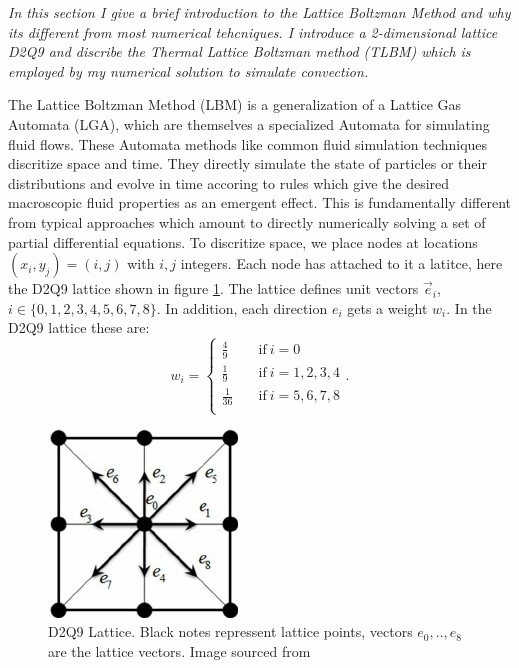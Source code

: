 \documentclass{article}
\begin{document}
{\it{In this section I give a brief introduction to the Lattice Boltzman Method and why its different from most numerical tehcniques. I introduce a 2-dimensional lattice D2Q9 and discribe the Thermal Lattice Boltzman method (TLBM) which is employed by my numerical solution to simulate convection.}}
\vspace{0.3cm}

\noindent The Lattice Boltzman Method (LBM) is a generalization of a Lattice Gas Automata (LGA), which are themselves a 
specialized Automata for simulating fluid flows. These Automata methods like common fluid simulation techniques 
discritize space and time. They directly simulate the state of particles or their distributions and evolve in time 
accoring to rules which give the desired macroscopic fluid properties as an emergent effect. This is fundamentally 
different from typical approaches which amount to directly numerically solving a set of partial differential equations.
\newline
\noindent To discritize space, we place nodes at locations $(x_i,y_j)=(i,j)$ with $i,j$ integers. Each node has attached to it a latitce, here the D2Q9 lattice shown in figure \ref{D2Q9}. The lattice defines unit vectors $\vec{e}_i$, $i \in \{ 0,1,2,3,4,5,6,7,8 \}$. In addition, each direction $e_i$ gets a weight $w_i$. In the D2Q9 lattice these are:
\begin{equation*}
w_i = \begin{cases}
          \frac{4}{9} \quad &\text{if}  \ i=0 \\
          \frac{1}{9} \quad &\text{if} \ i=1,2,3,4 \\
          \frac{1}{36} \quad &\text{if} \ i=5,6,7,8 \\
     \end{cases}.
\end{equation*}
\begin{figure}[h!]
	\centering
	\includegraphics{D2Q9Lattice.jpg}
	\caption{D2Q9 Lattice. Black notes repressent lattice points, vectors $e_0,..,e_8$ are the lattice vectors. Image sourced from \cite{khazaeli2015ghost}}
	\label{D2Q9}
\end{figure}
\end{document}

